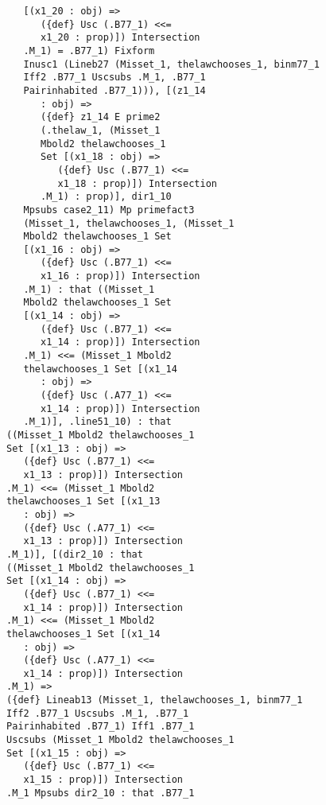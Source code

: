 \documentclass[12pt]{article}
\begin{document}
\begin{verbatim}
                [(x1_20 : obj) => 
                   ({def} Usc (.B77_1) <<= 
                   x1_20 : prop)]) Intersection 
                .M_1) = .B77_1) Fixform 
                Inusc1 (Lineb27 (Misset_1, thelawchooses_1, binm77_1 
                Iff2 .B77_1 Uscsubs .M_1, .B77_1 
                Pairinhabited .B77_1))), [(z1_14 
                   : obj) => 
                   ({def} z1_14 E prime2 
                   (.thelaw_1, (Misset_1 
                   Mbold2 thelawchooses_1 
                   Set [(x1_18 : obj) => 
                      ({def} Usc (.B77_1) <<= 
                      x1_18 : prop)]) Intersection 
                   .M_1) : prop)], dir1_10 
                Mpsubs case2_11) Mp primefact3 
                (Misset_1, thelawchooses_1, (Misset_1 
                Mbold2 thelawchooses_1 Set 
                [(x1_16 : obj) => 
                   ({def} Usc (.B77_1) <<= 
                   x1_16 : prop)]) Intersection 
                .M_1) : that ((Misset_1 
                Mbold2 thelawchooses_1 Set 
                [(x1_14 : obj) => 
                   ({def} Usc (.B77_1) <<= 
                   x1_14 : prop)]) Intersection 
                .M_1) <<= (Misset_1 Mbold2 
                thelawchooses_1 Set [(x1_14 
                   : obj) => 
                   ({def} Usc (.A77_1) <<= 
                   x1_14 : prop)]) Intersection 
                .M_1)], .line51_10) : that 
             ((Misset_1 Mbold2 thelawchooses_1 
             Set [(x1_13 : obj) => 
                ({def} Usc (.B77_1) <<= 
                x1_13 : prop)]) Intersection 
             .M_1) <<= (Misset_1 Mbold2 
             thelawchooses_1 Set [(x1_13 
                : obj) => 
                ({def} Usc (.A77_1) <<= 
                x1_13 : prop)]) Intersection 
             .M_1)], [(dir2_10 : that 
             ((Misset_1 Mbold2 thelawchooses_1 
             Set [(x1_14 : obj) => 
                ({def} Usc (.B77_1) <<= 
                x1_14 : prop)]) Intersection 
             .M_1) <<= (Misset_1 Mbold2 
             thelawchooses_1 Set [(x1_14 
                : obj) => 
                ({def} Usc (.A77_1) <<= 
                x1_14 : prop)]) Intersection 
             .M_1) => 
             ({def} Lineab13 (Misset_1, thelawchooses_1, binm77_1 
             Iff2 .B77_1 Uscsubs .M_1, .B77_1 
             Pairinhabited .B77_1) Iff1 .B77_1 
             Uscsubs (Misset_1 Mbold2 thelawchooses_1 
             Set [(x1_15 : obj) => 
                ({def} Usc (.B77_1) <<= 
                x1_15 : prop)]) Intersection 
             .M_1 Mpsubs dir2_10 : that .B77_1 

\end{verbatim}
\end{document}
